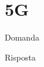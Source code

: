 \section{5G}

\begin{questions}
    \question Domanda
    
    \begin{solution}
        Risposta
    \end{solution}
\end{questions}